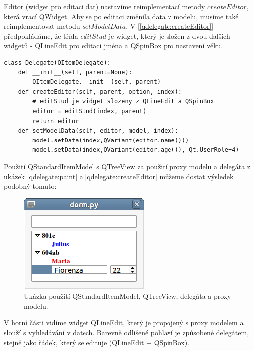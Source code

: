 Editor (widget pro editaci dat) nastavíme reimplementací metody $createEditor$, která vrací QWidget. Aby se po editaci změnila data v modelu, musíme také reimplementovat metodu $setModelData$. V [\lstlistingname \ref{qdelegate:createEditor}] předpokládáme, že třída $editStud$ je widget, který je složen z dvou dalších widgetů - QLineEdit pro editaci jména a QSpinBox pro nastavení věku. \\
\newpage
\begin{lstlisting}[label=qdelegate:createEditor,caption={Delegate - přepsání metod $createEditor$ a $setModelData$}, morekeywords={QItemDelegate, Qt, QFont, AlignLeft, DisplayRole, UserRole, QPen}]
class Delegate(QItemDelegate):
    def __init__(self, parent=None):
        QItemDelegate.__init__(self, parent)
    def createEditor(self, parent, option, index):
    	# editStud je widget slozeny z QLineEdit a QSpinBox
        editor = editStud(index, parent)
        return editor    
    def setModelData(self, editor, model, index):
        model.setData(index,QVariant(editor.name()))
        model.setData(index,QVariant(editor.age()), Qt.UserRole+4)
\end{lstlisting}

Použití QStandardItemModel s QTreeView za použití proxy modelu a delegáta z ukázek \ref{qdelegate:paint} a \ref{qdelegate:createEditor} můžeme dostat výsledek podobný tomuto:

\begin{figure}[h]
	\centering
	\includegraphics[scale=0.7]{pictures/qt/dorm}
	\caption{Ukázka použití QStandardItemModel, QTreeView, delegáta a proxy modelu.}
	\label{pic:delegate}
\end{figure} 

\noindent
V horní části vidíme widget QLineEdit, který je propojený s proxy modelem a slouží s vyhledávání v datech. Barevně odlišené pohlaví je způsobené delegátem, stejně jako řádek, který se edituje (QLineEdit + QSpinBox). %

